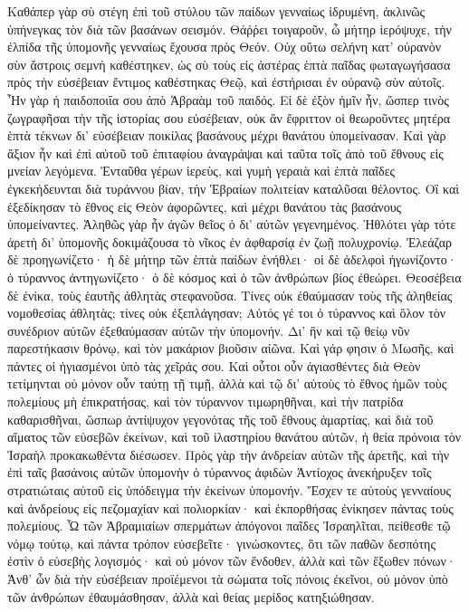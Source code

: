 Καθάπερ γὰρ σὺ στέγη ἐπὶ τοῦ στύλου τῶν παίδων γενναίως ἱδρυμένη, ἀκλινῶς ὑπήνεγκας τὸν διὰ τῶν βασάνων σεισμόν. 
Θάῤῥει τοιγαροῦν, ὦ μήτηρ ἱερόψυχε, τὴν ἐλπίδα τῆς ὑπομονῆς γενναίως ἔχουσα πρὸς Θεόν. 
Οὐχ οὕτω σελήνη κατ' οὐρανὸν σὺν ἄστροις σεμνὴ καθέστηκεν, ὡς σὺ τοὺς εἰς ἀστέρας ἑπτὰ παῖδας φωταγωγήσασα πρὸς τὴν εὐσέβειαν ἔντιμος καθέστηκας Θεῷ, καὶ ἐστήρισαι ἐν οὐρανῷ σὺν αὐτοῖς. 
Ἦν γὰρ ἡ παιδοποιΐα σου ἀπὸ Ἁβραὰμ τοῦ παιδός. 
Εἰ δὲ ἐξὸν ἡμῖν ἦν, ὥσπερ τινὸς ζωγραφῆσαι τὴν τῆς ἱστορίας σου εὐσέβειαν, οὐκ ἂν ἔφριττον οἱ θεωροῦντες μητέρα ἑπτὰ τέκνων δι' εὐσέβειαν ποικίλας βασάνους μέχρι θανάτου ὑπομείνασαν. 
Καὶ γὰρ ἄξιον ἦν καὶ ἐπὶ αὐτοῦ τοῦ ἐπιταφίου ἀναγράψαι καὶ ταῦτα τοῖς ἀπὸ τοῦ ἔθνους εἰς μνείαν λεγόμενα. 
Ἐνταῦθα γέρων ἱερεὺς, καὶ γυμὴ γεραιὰ καὶ ἑπτὰ παῖδες ἐγκεκήδευνται διὰ τυράννου βίαν, τὴν Ἑβραίων πολιτείαν καταλῦσαι θέλοντος. 
Οἳ καὶ ἐξεδίκησαν τὸ ἔθνος εἰς Θεὸν ἀφορῶντες, καὶ μέχρι θανάτου τὰς βασάνους ὑπομείναντες. 
Ἀληθῶς γὰρ ἦν ἀγῶν θεῖος ὁ δι' αὐτῶν γεγενημένος. 
Ἠθλότει γὰρ τότε ἀρετὴ δι' ὑπομονῆς δοκιμάζουσα τὸ νῖκος ἐν ἀφθαρσίᾳ ἐν ζωῇ πολυχρονίῳ. 
Ἐλεάζαρ δὲ προηγωνίζετο· ἡ δὲ μήτηρ τῶν ἑπτὰ παίδων ἐνήθλει· 
οἱ δὲ ἀδελφοὶ ἠγωνίζοντο· ὁ τύραννος ἀντηγωνίζετο· ὁ δὲ κόσμος καὶ ὁ τῶν ἀνθρώπων βίος ἐθεώρει. 
Θεοσέβεια δὲ ἐνίκα, τοὺς ἑαυτῆς ἀθλητὰς στεφανοῦσα. 
Τίνες οὐκ ἐθαύμασαν τοὺς τῆς ἀληθείας νομοθεσίας ἀθλητὰς; τίνες οὐκ ἐξεπλάγησαν; 
Αὐτός γέ τοι ὁ τύραννος καὶ ὅλον τὸν συνέδριον αὐτῶν ἐξεθαύμασαν αὐτῶν τὴν ὑπομονήν. 
Δι' ἣν καὶ τῷ θείῳ νῦν παρεστήκασιν θρόνῳ, καὶ τὸν μακάριον βιοῦσιν αἰῶνα. 
Καὶ γάρ φησιν ὁ Μωσῆς, καὶ πάντες οἱ ἡγιασμένοι ὑπὸ τὰς χεῖράς σου. 
Καὶ οὗτοι οὖν ἁγιασθέντες διὰ Θεὸν τετίμηνται οὐ μόνον οὖν ταύτῃ τῇ τιμῇ, ἀλλὰ καὶ τῷ δι' αὐτοὺς τὸ ἔθνος ἡμῶν τοὺς πολεμίους μὴ ἐπικρατήσας, 
καὶ τὸν τύραννον τιμωρηθῆναι, καὶ τὴν πατρίδα καθαρισθῆναι, 
ὥσπωρ ἀντίψυχον γεγονότας τῆς τοῦ ἔθνους ἁμαρτίας, καὶ διὰ τοῦ αἵματος τῶν εὐσεβῶν ἐκείνων, καὶ τοῦ ἱλαστηρίου θανάτου αὐτῶν, ἡ θεία πρόνοια τὸν Ἰσραὴλ προκακωθέντα διέσωσεν. 
Πρὸς γὰρ τὴν ἀνδρείαν αὐτῶν τῆς ἀρετῆς, καὶ τὴν ἐπὶ ταῖς βασάνοις αὐτῶν ὑπομονὴν ὁ τύραννος ἀφιδὼν Ἀντίοχος ἀνεκήρυξεν τοῖς στρατιώταις αὐτοῦ εἰς ὑπόδειγμα τὴν ἐκείνων ὑπομονήν. 
Ἔσχεν τε αὐτοὺς γενναίους καὶ ἀνδρείους εἰς πεζομαχίαν καὶ πολιορκίαν· καὶ ἐκπορθήσας ἐνίκησεν πάντας τοὺς πολεμίους. 
Ὦ τῶν Ἁβραμιαίων σπερμάτων ἀπόγονοι παῖδες Ἰσραηλῖται, πείθεσθε τῷ νόμῳ τούτῳ, καὶ πάντα τρόπον εὐσεβεῖτε· 
γινώσκοντες, ὅτι τῶν παθῶν δεσπότης ἐστὶν ὁ εὐσεβὴς λογισμός· καὶ οὐ μόνον τῶν ἔνδοθεν, ἀλλὰ καὶ τῶν ἔξωθεν πόνων· 
Ἀνθ' ὦν διὰ τὴν εὐσέβειαν προϊέμενοι τὰ σώματα τοῖς πόνοις ἐκεῖνοι, οὐ μόνον ὑπὸ τῶν ἀνθρώπων ἐθαυμάσθησαν, ἀλλὰ καὶ θείας μερίδος κατηξιώθησαν. 
